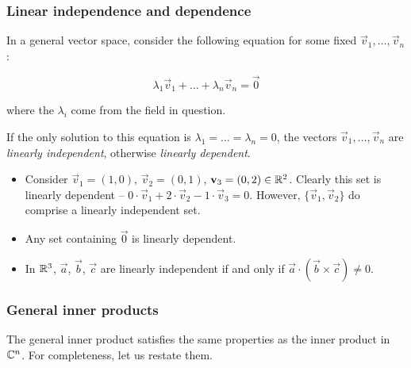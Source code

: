 \documentclass{../template/note}
\begin{document}
    \subsubsection{Linear independence and dependence}
    
    In a general vector space, consider the following equation for some fixed \(\vec v_1, \dots, \vec v_n\):
    
    \[
        \lambda_1 \vec v_1 + \dots + \lambda_n \vec v_n = \vec 0
    \]
    
    where the \(\lambda_i\) come from the field in question.

    \begin{definition}
        If the only solution to this equation is \(\lambda_1 = \dots = \lambda_n = 0\), the vectors \(\vec v_1, \dots, \vec v_n\) are \emph{linearly independent}, otherwise \emph{linearly dependent}.
    \end{definition}
    
    \begin{example}
        \begin{itemize}
            \item Consider \(\vec v_1 = (1, 0)\), \(\vec v_2 = (0, 1)\), \(\vec v_3 = (0, 2) \in \RR^2\). Clearly this set is linearly dependent -- \(0 \cdot \vec v_1 + 2 \cdot \vec v_2 - 1 \cdot \vec v_3 = 0\). However, \(\{\vec v_1, \vec v_2\}\) do comprise a linearly independent set.
            \item Any set containing \(\vec 0\) is linearly dependent.
            \item In \(\mathbb R^3\), \(\vec a\), \(\vec b\), \(\vec c\) are linearly independent if and only if \(\vec a \cdot (\vec b \times \vec c) \neq 0\).
        \end{itemize}
    \end{example}
    
    \subsubsection{General inner products}

    The general inner product satisfies the same properties as the inner product in \(\mathbb C^n\). For completeness, let us restate them.
\end{document}
